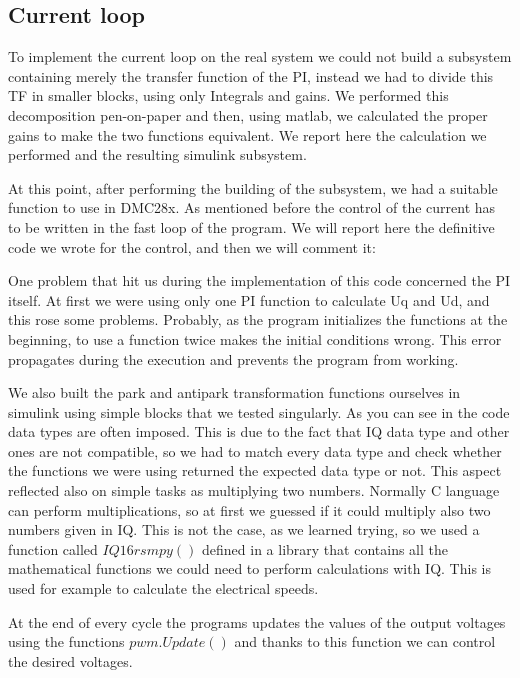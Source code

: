 \documentclass[12pt]{article}
\begin{document}
\subsection{Current loop}
To implement the current loop on the real system we could not build a subsystem containing merely the transfer 
function of the PI, instead we had to divide this TF in smaller blocks, using only Integrals and gains. 
We performed this decomposition pen-on-paper and then, using matlab, we calculated the proper gains to make 
the two functions equivalent. 
We report here the calculation we performed and the resulting simulink subsystem.

At this point, after performing the building of the subsystem, we had a suitable function to use in DMC28x.
As mentioned before the control of the current has to be written in the fast loop of the program. We will report here 
the definitive code we wrote for the control, and then we will comment it:

One problem that hit us during the implementation of this code concerned the PI itself. At first we were using only 
one PI function to calculate Uq and Ud, and this rose some problems. Probably, as the program initializes the 
functions at the beginning, to use a function twice makes the initial conditions wrong. This error propagates during the execution and prevents the program from working. 

We also built the park and antipark transformation functions ourselves in simulink using simple blocks that we tested singularly.
As you can see in the code data types are often imposed. 
This is due to the fact that IQ data type and other ones are not compatible, so we had to match every data type
and check whether the functions we were using returned the expected data type or not. This aspect reflected also 
on simple tasks as multiplying two numbers. Normally C language can perform multiplications, so at first we guessed 
if it could multiply also two numbers given in IQ. This is not the case, as we learned trying, so we used a function 
called $IQ16rsmpy()$ defined in a library that contains all the mathematical functions we could need to perform calculations with IQ. This is used for example to calculate the electrical speeds. 

At the end of every cycle the programs updates the values of the output voltages using the functions $pwm.Update()$
and thanks to this function we can control the desired voltages.
\end{document}
